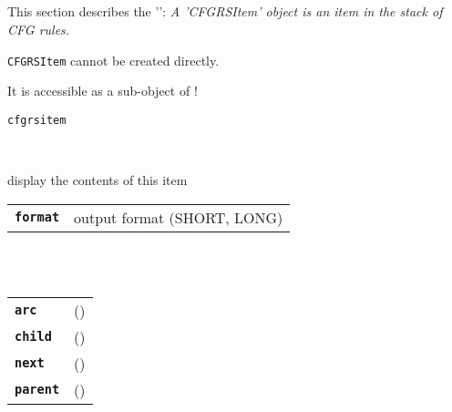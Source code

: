 
\subsection{}

This section describes the '': \textsl{A 'CFGRSItem' object is an item in the stack of CFG rules.}

\begin{description}
\vspace{3mm}  \item[Creation:] \texttt{CFGRSItem} cannot be created directly.\

It is accessible as a sub-object of !

\vspace{3mm} \item[Methods:] \texttt{cfgrsitem}

    \begin{description}
       \texttt{ } \

        display the contents of this item

      \begin{tabular}{ll}
 \texttt{\textbf{format}} &  output format (SHORT, LONG)  \\
      \end{tabular}
    \end{description}

  \item[Subobjects:] \hfill \\
\ 
    \begin{tabular}{ll}
      \texttt{\textbf{arc}} & (\Jref{module}{???}) \\
      \texttt{\textbf{child}} & (\Jref{module}{???}) \\
      \texttt{\textbf{next}} & (\Jref{module}{???}) \\
      \texttt{\textbf{parent}} & (\Jref{module}{???}) \\
    \end{tabular}
\vspace{3mm}

\end{description}

